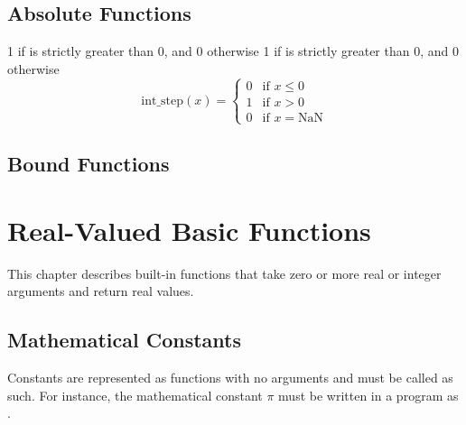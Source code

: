 \begin{description}

\end{description}

\section{Absolute Functions}

\begin{description}
%
%
1 if  is strictly greater than 0, and 0 otherwise
%
1 if  is strictly greater than 0, and 0 otherwise
\[
\mbox{int\_step}(x) = 
\begin{cases}
  0 & \mbox{if } x \leq 0 \\
  1 & \mbox{if } x > 0  \\[6pt]
  0 & \mbox{if } x = \textrm{NaN}
\end{cases}
\]
%
\end{description}
%

\section{Bound Functions}
%
\begin{description}
%
%
\end{description}


\chapter{Real-Valued Basic Functions}

\noindent
This chapter describes built-in functions that take zero or more real
or integer arguments and return real values.  

\section{Mathematical Constants}\label{built-in-constants.section}

Constants are represented as functions with no arguments and must be
called as such.  For instance, the mathematical constant $\pi$ must be
written in a \Stan program as .

